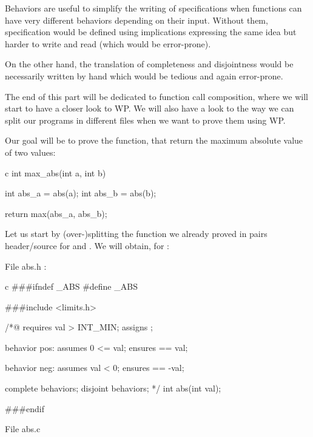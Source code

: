 \documentclass[middle]{zmdocument}
\begin{document}
Behaviors are useful to simplify the writing of specifications when
functions can have very different behaviors depending on their input.
Without them, specification would be defined using implications
expressing the same idea but harder to write and read (which would be
error-prone).



On the other hand, the translation of completeness and disjointness
would be necessarily written by hand which would be tedious and again
error-prone.





The end of this part will be dedicated to function call composition,
where we will start to have a closer look to WP. We will also have a
look to the way we can split our programs in different files when we
want to prove them using WP.

Our goal will be to prove the  function, that return
the maximum absolute value of two values:



\begin{CodeBlock}{c}
int max_abs(int a, int b){
  int abs_a = abs(a);
  int abs_b = abs(b);

  return max(abs_a, abs_b);
}
\end{CodeBlock}


Let us start by (over-)splitting the function we already proved in pairs
header/source for  and . We will obtain, for
:



File abs.h :



\begin{CodeBlock}{c}
###ifndef _ABS
#define _ABS

###include <limits.h>

/*@
  requires val > INT_MIN;
  assigns  \nothing;

  behavior pos:
    assumes 0 <= val;
    ensures \result == val;
  
  behavior neg:
    assumes val < 0;
    ensures \result == -val;
 
  complete behaviors;
  disjoint behaviors;
*/
int abs(int val);

###endif
\end{CodeBlock}



File abs.c
\end{document}
